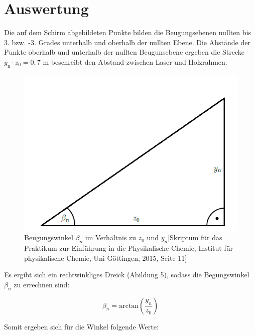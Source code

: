 \documentclass[12pt,a4paper,titlepage,headinclude,bibtotoc]{scrartcl}
\begin{document}
\newpage
\section{Auswertung}

Die auf dem Schirm abgebildeten Punkte bilden die Beugungsebenen nullten bis 3. bzw. -3. Grades unterhalb und oberhalb der nullten Ebene. Die Abstände der Punkte oberhalb und unterhalb der nullten Beugunsebene ergeben die Strecke $y_\mathrm {n} \cdot z_0= 0,7 $ m beschreibt den Abstand zwischen Laser und Holzrahmen. 

\begin{figure} [h]
\begin{center}
\includegraphics[scale=0.4]{Dreieck.png} \end{center}
\caption{Beugungswinkel $\beta_n$ im Verhältnis zu $z_0$ und $y_n$[Skriptum für das Praktikum zur Einführung in die Physikalische Chemie, Institut für physikalische Chemie, Uni Göttingen, 2015, Seite 11]}
\end{figure}

Es ergibt sich ein rechtwinkliges Dreick (Abildung 5), sodass die Begungswinkel $\beta_n$ zu errechnen sind:

\begin{equation}
\beta_n = \mathrm {arctan} \left(\frac{y_n}{z_0}\right)
\end{equation}

\par

\vspace{2cm}

Somit ergeben sich für die Winkel folgende Werte: 
\end{document}

